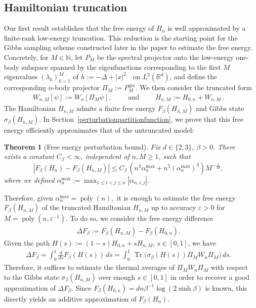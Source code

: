 \documentclass[11pt]{amsart}
\newcommand{\1}{\mathbbm{1}}
\newcommand{\Tr}{\operatorname{Tr}}
\newcommand{\eps}{\varepsilon}
\theoremstyle{plain}
\newtheorem{theorem}{Theorem}[section]
\theoremstyle{definition}
\theoremstyle{remark}
\numberwithin{equation}{section}
\begin{document}
\subsection{Hamiltonian truncation}
\label{sec:HamiltonianTruncation}
Our first result establishes that the free energy of \(H_n\) is well approximated by a finite-rank low-energy truncation. This reduction is the starting point for the Gibbs sampling scheme constructed later in the paper to estimate the free energy. Concretely, for \(M\in\mathbb N\), let \(P_M\) be the spectral projector onto the low-energy one-body subspace spanned by the eigenfunctions corresponding to the first \(M\) eigenvalues \((\lambda_k)_{k=1}^M\) of $h:=-\Delta+|x|^2
\quad\text{on }L^2(\mathbb R^d)$, and define the corresponding \(n\)-body projector $\Pi_M:=P_M^{\otimes n}$. We then consider the truncated form 
\begin{align*}
W_{n,M}[\psi]:=W_n[\Pi_M\psi],\qquad \text{ and }\qquad H_{n,M}:=H_{0,n}+W_{n,M}\,.
\end{align*}
The Hamiltonian $H_{n,M}$ admits a finite free energy $F_{\beta}(H_{n,M})$ and Gibbs state $\sigma_\beta(H_{n,M})$. In Section~\ref{perturbationpartitionfunction}, we prove that this free energy efficiently approximates that of the untruncated model:
\begin{theorem}[Free energy perturbation bound]\label{thmfreenregyblablaIntro}
Fix $d\in\{2,3\}$, $\beta>0$. There exists a constant $C_\beta<\infty$, independent of $n,M\ge 1$, such that
\[
|F_\beta(H_n)-F_{\beta}(H_{n,M})|
\le C_\beta\,\left(n^{3}\alpha^{\max}_n + n^5 \left(\alpha^{\max}_n\right)^3\right)M^{-\frac{1}{4d}},
\]
where we defined $\alpha^{\max}_{n} :=\max_{1\le i<j\le n} |\alpha_{n,i,j}|.$
\end{theorem}
\noindent Therefore, given $\alpha^{\max}_n=\operatorname{poly}(n),$ it is enough to estimate the free energy $F_\beta(H_{n,M})$ of the truncated Hamiltonian $H_{n,M}$ up to accuracy $\eps>0$ for $M=\operatorname{poly}(n,\varepsilon^{-1})$. To do so, we consider the free energy difference
\begin{align*}
\Delta F_\beta:=F_\beta(H_{n,M})-F_\beta(H_{0,n}).
\end{align*}
Given the path $H(s):=(1-s)H_{0,n}+sH_{n,M}$, $s\in[0,1]$, we have
\begin{align}
\Delta F_\beta=\int_0^1 \frac{d}{ds} F_\beta(H(s))\,ds= \int_0^1\,\Tr\Big(\sigma_\beta(H(s))\Pi_M W_n \Pi_M \Big)\, ds.\nonumber
\end{align}
Therefore, it suffices to estimate the thermal averages of $\Pi_M W_n\Pi_M$ with respect to the Gibbs state $\sigma_\beta(H_{n,M})$ over enough $s\in[0,1]$ in order to recover a good approximation of $\Delta F_\beta$. Since $F_\beta(H_{0,n})={dn}\beta^{-1}\log(2\sinh\beta)$ is known, this directly yields an additive approximation of $F_{\beta}(H_{n})$.
\end{document}
